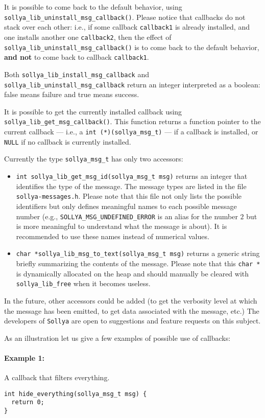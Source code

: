 \documentclass[a4paper]{article}
\newcommand{\sollya}{\texttt{Sollya}\xspace}
\begin{document}
It is possible to come back to the default behavior, using \verb|sollya_lib_uninstall_msg_callback()|. Please notice that callbacks do not stack over each other: i.e., if some callback \verb|callback1| is already installed, and one installs another one \verb|callback2|, then the effect of \verb|sollya_lib_uninstall_msg_callback()| is to come back to the default behavior, \textbf{and not} to come back to callback \verb|callback1|.

Both \verb|sollya_lib_install_msg_callback| and \verb|sollya_lib_uninstall_msg_callback| return an integer interpreted as a boolean: false means failure and true means success.

It is possible to get the currently installed callback using \verb|sollya_lib_get_msg_callback()|. This function returns a function pointer to the current callback --- i.e., a \verb|int (*)(sollya_msg_t)| --- if a callback is installed, or \verb|NULL| if no callback is currently installed.

Currently the type \verb|sollya_msg_t| has only two accessors:
\begin{itemize}
\item \verb|int sollya_lib_get_msg_id(sollya_msg_t msg)| returns an integer that identifies the type of the message. The message types are listed in the file \verb|sollya-messages.h|. Please note that this file not only lists the possible identifiers but only defines meaningful names to each possible message number (e.g., \verb|SOLLYA_MSG_UNDEFINED_ERROR| is an alias for the number $2$ but is more meaningful to understand what the message is about). It is recommended to use these names instead of numerical values.
\item \verb|char *sollya_lib_msg_to_text(sollya_msg_t msg)| returns a generic string briefly summarizing the contents of the message. Please note that this \verb|char *| is dynamically allocated on the heap and should manually be cleared with \verb|sollya_lib_free| when it becomes useless.
\end{itemize}
In the future, other accessors could be added (to get the verbosity level at which the message has been emitted, to get data associated with the message, etc.) The developers of \sollya are open to suggestions and feature requests on this subject.

As an illustration let us give a few examples of possible use of callbacks:
\paragraph{Example 1:} A callback that filters everything.
\begin{center}
\begin{minipage}{15cm}\begin{Verbatim}[frame=single]
int hide_everything(sollya_msg_t msg) {
  return 0;
}
\end{Verbatim}
\end{minipage}\end{center}
\end{document}

